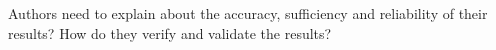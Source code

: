 \documentclass[12pt,american]{scrartcl}
\begin{document}
\begin{revcomment}
  Authors need to explain about the accuracy, sufficiency and reliability of their results? How do they verify and validate the results?
\end{revcomment}
\begin{revresponse}
  
\end{revresponse}
\end{document}

